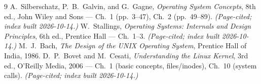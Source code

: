 \documentclass[11pt]{article}
\begin{document}
\begin{thebibliography}{9}
A.~Silberschatz, P.~B.~Galvin, and G.~Gagne, \emph{Operating System Concepts}, 8th ed., John Wiley and Sons --- Ch.~1 (pp.~3--47), Ch.~2 (pp.~49--89). \emph{(Page-cited; index built 2026-10-14.)}
W.~Stallings, \emph{Operating Systems: Internals and Design Principles}, 6th ed., Prentice Hall --- Ch.~1--3. \emph{(Page-cited; index built 2026-10-14.)}
M.~J.~Bach, \emph{The Design of the UNIX Operating System}, Prentice Hall of India, 1986.
D.~P.~Bovet and M.~Cesati, \emph{Understanding the Linux Kernel}, 3rd ed., O'Reilly Media, 2006 --- Ch.~1 (basic concepts, files/inodes), Ch.~10 (system calls). \emph{(Page-cited; index built 2026-10-14.)}
\end{thebibliography}
\end{document}
